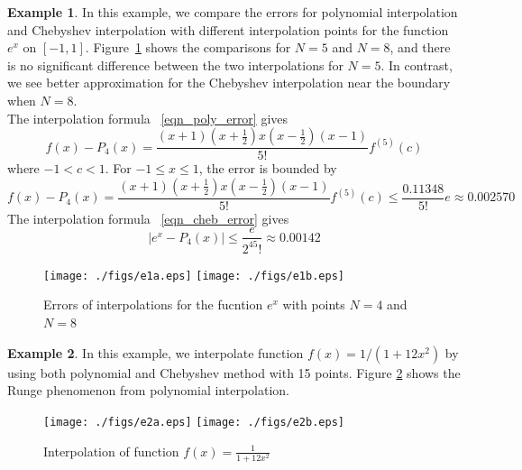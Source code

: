 \documentclass[11pt,reqno]{amsart}
\theoremstyle{definition}
\newtheorem{exmp}{Example}[section]
\begin{document}
\begin{exmp}
In this example, we compare the errors for polynomial interpolation and Chebyshev interpolation with different interpolation points for the function $e^x$ on $[-1,1]$. Figure~\ref{fig:e1} shows the comparisons for $N=5$ and $N=8$, and there is no significant difference between the two interpolations for $N=5$. In contrast, we see better approximation for the Chebyshev interpolation near the boundary when  $N=8$.\\
The interpolation formula ~\eqref{eqn_poly_error} gives 
\begin{equation}
f(x)-P_4(x)=\frac{(x+1)(x+\frac{1}{2})x(x-\frac{1}{2})(x-1)}{5!}f^{(5)}(c)
\end{equation}
where $-1<c<1$. For $-1\leq x\leq 1$, the error is bounded by
\begin{equation*}
f(x)-P_4(x)=\frac{(x+1)(x+\frac{1}{2})x(x-\frac{1}{2})(x-1)}{5!}f^{(5)}(c)\leq \frac{0.11348}{5!}e\approx 0.002570
\end{equation*}
The interpolation formula ~\eqref{eqn_cheb_error} gives 
\begin{equation*}
|e^x-P_4(x)|\leq \frac{e}{2^45!}\approx 0.00142
\end{equation*}

\begin{figure}     	\centerline{\texttt{[image: ./figs/e1a.eps]}
      	\hspace{-6pt}
     	\texttt{[image: ./figs/e1b.eps]}}
     	\hspace{-6pt}
		\caption{Errors of interpolations for the fucntion $e^x$ with points $N=4$ and $N=8$}
        \label{fig:e1}
\end{figure}
\end{exmp}

\begin{exmp}
In this example, we interpolate function $f(x)=1/(1+12x^2)$ by using both polynomial and Chebyshev method with 15 points. Figure \ref{fig:e2} shows the Runge phenomenon from polynomial interpolation.
\begin{figure}[H] 	
        \centerline{\texttt{[image: ./figs/e2a.eps]}
      	\hspace{-6pt}
     	\texttt{[image: ./figs/e2b.eps]}}
     	\hspace{-6pt}
		\caption{Interpolation of function $f(x)=\frac{1}{1+12x^2}$}
        \label{fig:e2}
\end{figure}
\end{exmp}

\end{document}
